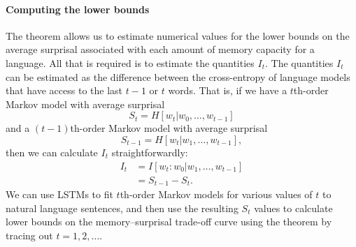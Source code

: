 
\paragraph{Computing the lower bounds}
The theorem allows us to estimate numerical values for the lower bounds on the average surprisal associated with each amount of memory capacity for a language.
All that is required is to estimate the quantities $I_t$.
The quantities $I_t$ can be estimated as the difference between the cross-entropy of language models that have access to the last $t-1$ or $t$ words.
That is, if we have a $t$th-order Markov model with average surprisal
\begin{equation}
    S_t = H[w_t | w_0, \dots, w_{t-1}]
\end{equation}
and a $(t-1)$th-order Markov model with average surprisal
\begin{equation}
    S_{t-1} = H[w_t | w_1, \dots, w_{t-1}],
\end{equation}
then we can calculate $I_t$ straightforwardly:
\begin{align}
    I_t &= I[w_t : w_0 | w_1, \dots, w_{t-1}] \\
    &= S_{t-1} - S_t.
\end{align}
We can use LSTMs to fit $t$th-order Markov models for various values of $t$ to natural language sentences, and then use the resulting $S_t$ values to calculate lower bounds on the memory--surprisal trade-off curve using the theorem by tracing out $t=1, 2, \dots$.




